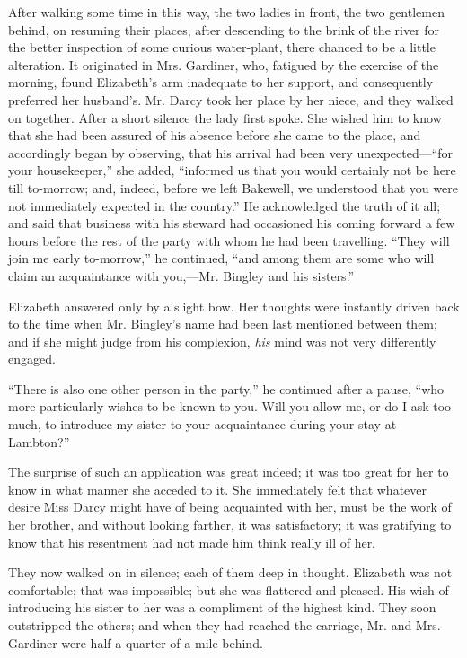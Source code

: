 \documentclass[12pt]{book}
\begin{document}
After walking some time in this way, the two ladies in front, the two gentlemen behind, on resuming their places, after descending to the brink of the river for the better inspection of some curious water-plant, there chanced to be a little alteration. It originated in Mrs. Gardiner, who, fatigued by the exercise of the morning, found Elizabeth's arm inadequate to her support, and consequently preferred her husband's. Mr. Darcy took her place by her niece, and they walked on together. After a short silence the lady first spoke. She wished him to know that she had been assured of his absence before she came to the place, and accordingly began by observing, that his arrival had been very unexpected---``for your housekeeper,'' she added, ``informed us that you would certainly not be here till to-morrow; and, indeed, before we left Bakewell, we understood that you were not immediately expected in the country.'' He acknowledged the truth of it all; and said that business with his steward had occasioned his coming forward a few hours before the rest of the party with whom he had been travelling. ``They will join me early to-morrow,'' he continued, ``and among them are some who will claim an acquaintance with you,---Mr. Bingley and his sisters.''

Elizabeth answered only by a slight bow. Her thoughts were instantly driven back to the time when Mr. Bingley's name had been last mentioned between them; and if she might judge from his complexion, \textit{his} mind was not very differently engaged.

``There is also one other person in the party,'' he continued after a pause, ``who more particularly wishes to be known to you. Will you allow me, or do I ask too much, to introduce my sister to your acquaintance during your stay at Lambton?''

The surprise of such an application was great indeed; it was too great for her to know in what manner she acceded to it. She immediately felt that whatever desire Miss Darcy might have of being acquainted with her, must be the work of her brother, and without looking farther, it was satisfactory; it was gratifying to know that his resentment had not made him think really ill of her.

They now walked on in silence; each of them deep in thought. Elizabeth was not comfortable; that was impossible; but she was flattered and pleased. His wish of introducing his sister to her was a compliment of the highest kind. They soon outstripped the others; and when they had reached the carriage, Mr. and Mrs. Gardiner were half a quarter of a mile behind.
\end{document}
